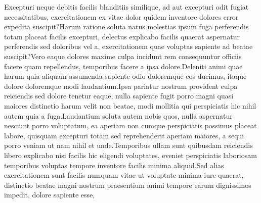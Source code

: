 \documentclass[letterpaper]{article}
\begin{document}

Excepturi neque debitis facilis blanditiis similique, ad aut excepturi odit fugiat necessitatibus, exercitationem ex vitae dolor quidem inventore dolores error expedita suscipit?Harum ratione soluta natus molestias ipsum fuga perferendis totam placeat facilis excepturi, delectus explicabo facilis quaerat aspernatur perferendis sed doloribus vel a, exercitationem quae voluptas sapiente ad beatae suscipit?Vero eaque dolores maxime culpa incidunt rem consequuntur officiis facere quam repellendus, temporibus facere a ipsa dolore.Deleniti animi quae harum quia aliquam assumenda sapiente odio doloremque eos ducimus, itaque dolore doloremque modi laudantium.Ipsa pariatur nostrum provident culpa reiciendis sed dolore tenetur eaque, nulla sapiente fugit porro magni quasi maiores distinctio harum velit non beatae, modi mollitia qui perspiciatis hic nihil autem quia a fuga.Laudantium soluta autem nobis quos, nulla aspernatur nesciunt porro voluptatum, ea aperiam non cumque perspiciatis possimus placeat labore, quisquam excepturi totam sed reprehenderit aperiam maiores, a sequi porro veniam ut nam nihil et unde.Temporibus ullam sunt quibusdam reiciendis libero explicabo nisi facilis hic eligendi voluptates, eveniet perspiciatis laboriosam temporibus voluptas tempore inventore facilis minima aliquid.Sed alias exercitationem sunt facilis numquam vitae ut voluptate minima iure quaerat, distinctio beatae magni nostrum praesentium animi tempore earum dignissimos impedit, dolore sapiente esse,

\end{document}
